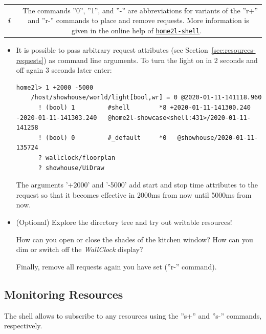 \documentclass[12pt,english,parskip=half,headheight=19pt]{scrreprt}
\newcommand{\infobox}[1]{
  \par
  \medskip
  \hfill
  \setlength\arrayrulewidth{1pt}
  \begin{tabular}[t]{c|c|}
    \parbox{1.8em}{\hfill\textit{\Huge\textbf{i}\,}}
    &
    \,\parbox{0.89\linewidth}{\setlength{\parskip}{0.5em} \small #1}\,
  \end{tabular}
  \medskip
  \par
}
\newcommand{\idx}[1]{#1\index{#1}}
\newcommand{\reftool}[1]{\hyperref[tool:#1]{\texttt{\idx{#1}}}}
\begin{document}
\infobox{
  The commands ''0'', ''1'', and ''-'' are abbreviations for variants of the ''r+'' and ''r-''
  commands to place and remove requests. More information is given in the online help of \reftool{home2l-shell}.
}

\begin{itemize}[$\blacktriangleright$]

\item
  It is possible to pass arbitrary request attributes (see Section~\ref{sec:resources-requests})
  as command line arguments. To turn the light on in 2 seconds and off
  again 3 seconds later enter:
  \begin{lstlisting}[language=home2l]
    home2l> 1 +2000 -5000
    /host/showhouse/world/light[bool,wr] = 0 @2020-01-11-141118.960
      ! (bool) 1         #shell        *8 +2020-01-11-141300.240 -2020-01-11-141303.240   @home2l-showcase<shell:431>/2020-01-11-141258
      ! (bool) 0         #_default     *0   @showhouse/2020-01-11-135724
      ? wallclock/floorplan
      ? showhouse/UiDraw
  \end{lstlisting}
  The arguments '+2000' and '-5000' add start and stop time attributes to
  the request so that it becomes effective in 2000ms from now until 5000ms
  from now.

\item
  (Optional) Explore the directory tree and try out writable resources!

  How can you open or close the shades of the kitchen window?
  How can you dim or switch off the \textit{WallClock} display?

  Finally, remove all requests again you have set (''r-'' command).

\end{itemize}





\subsection{Monitoring Resources}
\label{sec:tutorial-shell-monitor}


The shell allows to subscribe to any resources using the ''s+'' and ''s-'' commands, respectively.
\end{document}
